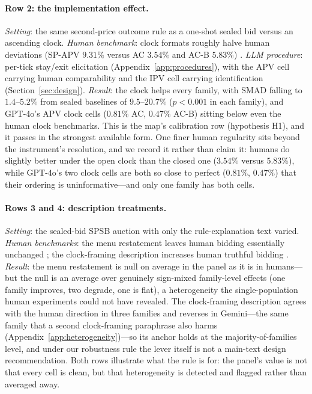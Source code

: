 \paragraph{Row 2: the implementation effect.}
\emph{Setting}: the same second-price outcome rule as a one-shot sealed bid versus an ascending clock. \emph{Human benchmark}: clock formats roughly halve human deviations (SP-APV $9.31\%$ versus AC $3.54\%$ and AC-B $5.83\%$) \citep{li2017obviously, breitmoser2022obviousness}. \emph{LLM procedure}: per-tick stay/exit elicitation (Appendix~\ref{app:procedures}), with the APV cell carrying human comparability and the IPV cell carrying identification (Section~\ref{sec:design}). \emph{Result}: the clock helps every family, with SMAD falling to $1.4$--$5.2\%$ from sealed baselines of $9.5$--$20.7\%$ ($p<0.001$ in each family), and GPT-4o's APV clock cells ($0.81\%$ AC, $0.47\%$ AC-B) sitting below even the human clock benchmarks. This is the map's calibration row (hypothesis H1), and it passes in the strongest available form. One finer human regularity sits beyond the instrument's resolution, and we record it rather than claim it: humans do slightly better under the open clock than the closed one ($3.54\%$ versus $5.83\%$), while GPT-4o's two clock cells are both so close to perfect ($0.81\%$, $0.47\%$) that their ordering is uninformative---and only one family has both cells.

\paragraph{Rows 3 and 4: description treatments.}
\emph{Setting}: the sealed-bid SPSB auction with only the rule-explanation text varied. \emph{Human benchmarks}: the menu restatement leaves human bidding essentially unchanged \citep{gonczarowski2023strategyproofness}; the clock-framing description increases human truthful bidding \citep{breitmoser2022obviousness}. \emph{Result}: the menu restatement is null on average in the panel as it is in humans---but the null is an average over genuinely sign-mixed family-level effects (one family improves, two degrade, one is flat), a heterogeneity the single-population human experiments could not have revealed. The clock-framing description agrees with the human direction in three families and reverses in Gemini---the same family that a second clock-framing paraphrase also harms (Appendix~\ref{app:heterogeneity})---so its anchor holds at the majority-of-families level, and under our robustness rule the lever itself is not a main-text design recommendation. Both rows illustrate what the rule is for: the panel's value is not that every cell is clean, but that heterogeneity is detected and flagged rather than averaged away.

